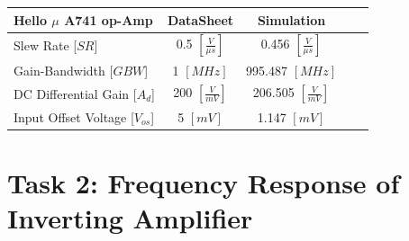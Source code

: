 \documentclass[11pt,a4paper]{article}
\begin{document}
\begin{enumerate}
\begin{minipage}{\linewidth}
\begin{center}
	\begin{tabular}{l*{3}{c}r}{Hello}
		$\mu$ A741 op-Amp              & DataSheet & Simulation  \\
		\hline
		Slew Rate [$SR$] & 0.5 $ [\frac{V}{\mu s}]$ & 0.456 $ 		 [\frac{V}{\mu s}]$ \\
	Gain-Bandwidth [$GBW$]& 1 $ [MHz]$  & 995.487 $ [MHz]$ \\
	DC Differential Gain [$A_{d}$] & 200 $[\frac{V}{mV}]$ & 206.505 $[\frac{V}{mV}]$ \\
	Input Offset Voltage [$V_{os}$] & 5 $[mV]$& 1.147 $[mV]$ \\
		\end{tabular}
\end{center}
\end{minipage}
\end{enumerate}

\section*{Task 2: Frequency Response of Inverting Amplifier}
\end{document}
